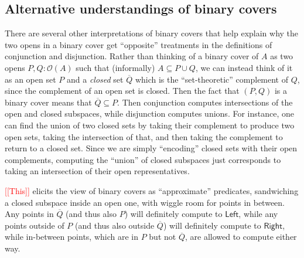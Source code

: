\documentclass[conference]{IEEEtran}
\newcommand{\Open}[1]{\mathcal{O}({#1})}
\newcommand{\note}[1]{\textcolor{red}{[[{#1}]]}}
\begin{document}
\subsection{Alternative understandings of binary covers}

There are several other interpretations of binary covers that help explain why the two opens in a binary cover get ``opposite'' treatments in the definitions of conjunction and disjunction. Rather than thinking of a binary cover of $A$ as two opens $P, Q : \Open{A}$ such that (informally) $A \subseteq P \cup Q$, we can instead think of it as an open set $P$ and a \emph{closed} set $\overline{Q}$ which is the ``set-theoretic'' complement of $Q$, since the complement of an open set is closed. Then the fact that $(P, Q)$ is a binary cover means that $\overline{Q} \subseteq P$. Then conjunction computes intersections of the open and closed subspaces, while disjunction computes unions.
For instance, one can find the union of two closed sets by taking their complement to produce two open sets, taking the intersection of that, and then taking the complement to return to a closed set. Since we are simply ``encoding'' closed sets with their open complements, computing the ``union'' of closed subspaces just corresponds to taking an intersection of their open representatives.

\note{This} elicits the view of binary covers as ``approximate'' predicates, sandwiching a closed subspace inside an open one, with wiggle room for points in between. Any points in $\overline{Q}$ (and thus also $P$) will definitely compute to $\mathsf{Left}$, while any points outside of $P$ (and thus also outside $\overline{Q}$) will definitely compute to $\mathsf{Right}$, while in-between points, which are in $P$ but not $\overline{Q}$, are allowed to compute either way.
\end{document}
